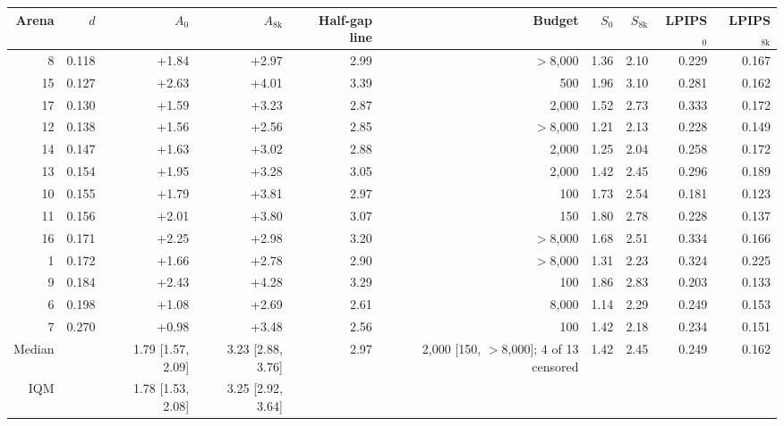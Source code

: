 \begin{tabular}{rrrrrrrrrr}
\toprule
Arena & $d$ & $A_0$ & $A_{\mathrm{8k}}$ & Half-gap line & Budget & $S_0$ & $S_{\mathrm{8k}}$ & LPIPS$_0$ & LPIPS$_{\mathrm{8k}}$ \\
\midrule
8 & 0.118 & +1.84 & +2.97 & 2.99 & ${>}$8,000 & 1.36 & 2.10 & 0.229 & 0.167 \\
15 & 0.127 & +2.63 & +4.01 & 3.39 & 500 & 1.96 & 3.10 & 0.281 & 0.162 \\
17 & 0.130 & +1.59 & +3.23 & 2.87 & 2,000 & 1.52 & 2.73 & 0.333 & 0.172 \\
12 & 0.138 & +1.56 & +2.56 & 2.85 & ${>}$8,000 & 1.21 & 2.13 & 0.228 & 0.149 \\
14 & 0.147 & +1.63 & +3.02 & 2.88 & 2,000 & 1.25 & 2.04 & 0.258 & 0.172 \\
13 & 0.154 & +1.95 & +3.28 & 3.05 & 2,000 & 1.42 & 2.45 & 0.296 & 0.189 \\
10 & 0.155 & +1.79 & +3.81 & 2.97 & 100 & 1.73 & 2.54 & 0.181 & 0.123 \\
11 & 0.156 & +2.01 & +3.80 & 3.07 & 150 & 1.80 & 2.78 & 0.228 & 0.137 \\
16 & 0.171 & +2.25 & +2.98 & 3.20 & ${>}$8,000 & 1.68 & 2.51 & 0.334 & 0.166 \\
1 & 0.172 & +1.66 & +2.78 & 2.90 & ${>}$8,000 & 1.31 & 2.23 & 0.324 & 0.225 \\
9 & 0.184 & +2.43 & +4.28 & 3.29 & 100 & 1.86 & 2.83 & 0.203 & 0.133 \\
6 & 0.198 & +1.08 & +2.69 & 2.61 & 8,000 & 1.14 & 2.29 & 0.249 & 0.153 \\
7 & 0.270 & +0.98 & +3.48 & 2.56 & 100 & 1.42 & 2.18 & 0.234 & 0.151 \\
\midrule
Median &  & 1.79 [1.57, 2.09] & 3.23 [2.88, 3.76] & 2.97 & 2,000 [150, ${>}$8,000]; 4 of 13 censored & 1.42 & 2.45 & 0.249 & 0.162 \\
IQM &  & 1.78 [1.53, 2.08] & 3.25 [2.92, 3.64] &  &  &  &  &  &  \\
\bottomrule
\end{tabular}
